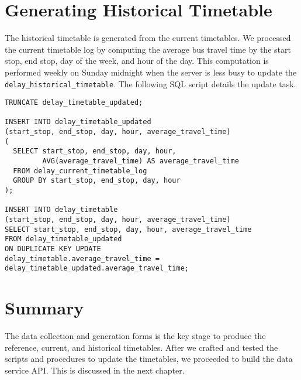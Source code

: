 \section{Generating Historical Timetable}
\label{sec:historical_timetable}
\par The historical timetable is generated from the current timetables. We processed the current timetable log by computing the average bus travel time by the start stop, end stop, day of the week, and hour of the day. This computation is performed weekly on Sunday midnight when the server is less busy to update the \texttt{delay\_historical\_timetable}. The following SQL script details the update task.

\begin{verbatim}
TRUNCATE delay_timetable_updated;

INSERT INTO delay_timetable_updated
(start_stop, end_stop, day, hour, average_travel_time)
(
  SELECT start_stop, end_stop, day, hour,
         AVG(average_travel_time) AS average_travel_time
  FROM delay_current_timetable_log
  GROUP BY start_stop, end_stop, day, hour
);

INSERT INTO delay_timetable
(start_stop, end_stop, day, hour, average_travel_time)
SELECT start_stop, end_stop, day, hour, average_travel_time
FROM delay_timetable_updated
ON DUPLICATE KEY UPDATE
delay_timetable.average_travel_time =
delay_timetable_updated.average_travel_time;
\end{verbatim}


\section{Summary}
\par The data collection and generation forms is the key stage to produce the reference, current, and historical timetables. After we crafted and tested the scripts and procedures to update the timetables, we proceeded to build the data service API. This is discussed in the next chapter.
